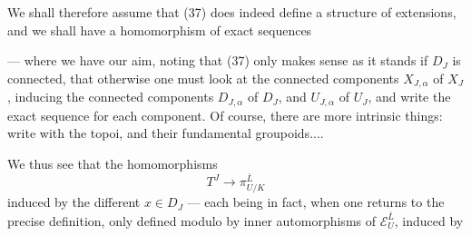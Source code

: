 
We shall therefore assume that (37) does indeed define a structure of extensions, and we shall have a homomorphism of exact sequences


--- where we have  our aim, noting that (37) only makes sense as it stands if $D_J$ is connected,  that otherwise one must look at the connected components $X_{J,\alpha}$ of $X_J$, inducing the connected components $D_{J,\alpha}$ of $D_J$, and $U_{J,\alpha}$ of $U_J$, and write the exact sequence for each component. Of course, there are more intrinsic things: write with the  topoi, and their fundamental groupoids....

We thus see that the homomorphisms
\[
\tag{39}
T^J\longrightarrow\pi_{U/K}^{\bar L}
\]
induced by the different $x\in D_J$ --- each being in fact, when one returns to the precise definition, only defined modulo   by inner automorphisms of $\mathcal E_U^{\bar L}$, induced by

